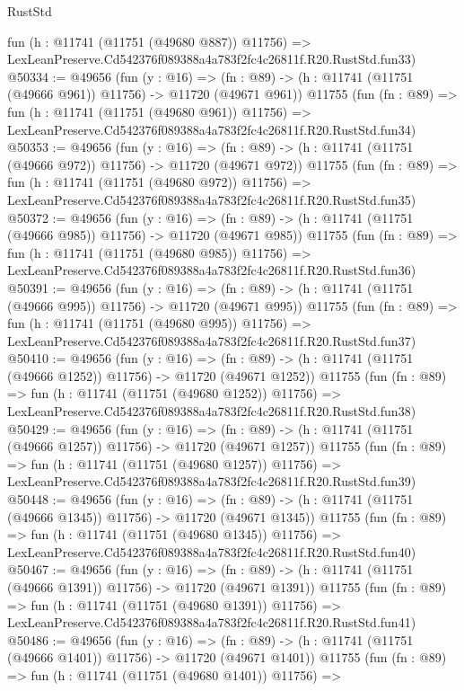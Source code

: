 \begin{lexlean}{RustStd}
\begin{coremodule}
    fun (h : @11741 (@11751 (@49680 @887)) @11756) =>
    LexLeanPreserve.Cd542376f089388a4a783f2fc4c26811f.R20.RustStd.fun33)
@50334 := @49656
    (fun (y : @16) =>
    (fn : @89) -> (h : @11741 (@11751 (@49666 @961)) @11756) -> @11720 (@49671 @961))
    @11755
    (fun (fn : @89) =>
    fun (h : @11741 (@11751 (@49680 @961)) @11756) =>
    LexLeanPreserve.Cd542376f089388a4a783f2fc4c26811f.R20.RustStd.fun34)
@50353 := @49656
    (fun (y : @16) =>
    (fn : @89) -> (h : @11741 (@11751 (@49666 @972)) @11756) -> @11720 (@49671 @972))
    @11755
    (fun (fn : @89) =>
    fun (h : @11741 (@11751 (@49680 @972)) @11756) =>
    LexLeanPreserve.Cd542376f089388a4a783f2fc4c26811f.R20.RustStd.fun35)
@50372 := @49656
    (fun (y : @16) =>
    (fn : @89) -> (h : @11741 (@11751 (@49666 @985)) @11756) -> @11720 (@49671 @985))
    @11755
    (fun (fn : @89) =>
    fun (h : @11741 (@11751 (@49680 @985)) @11756) =>
    LexLeanPreserve.Cd542376f089388a4a783f2fc4c26811f.R20.RustStd.fun36)
@50391 := @49656
    (fun (y : @16) =>
    (fn : @89) -> (h : @11741 (@11751 (@49666 @995)) @11756) -> @11720 (@49671 @995))
    @11755
    (fun (fn : @89) =>
    fun (h : @11741 (@11751 (@49680 @995)) @11756) =>
    LexLeanPreserve.Cd542376f089388a4a783f2fc4c26811f.R20.RustStd.fun37)
@50410 := @49656
    (fun (y : @16) =>
    (fn : @89) -> (h : @11741 (@11751 (@49666 @1252)) @11756) -> @11720 (@49671 @1252))
    @11755
    (fun (fn : @89) =>
    fun (h : @11741 (@11751 (@49680 @1252)) @11756) =>
    LexLeanPreserve.Cd542376f089388a4a783f2fc4c26811f.R20.RustStd.fun38)
@50429 := @49656
    (fun (y : @16) =>
    (fn : @89) -> (h : @11741 (@11751 (@49666 @1257)) @11756) -> @11720 (@49671 @1257))
    @11755
    (fun (fn : @89) =>
    fun (h : @11741 (@11751 (@49680 @1257)) @11756) =>
    LexLeanPreserve.Cd542376f089388a4a783f2fc4c26811f.R20.RustStd.fun39)
@50448 := @49656
    (fun (y : @16) =>
    (fn : @89) -> (h : @11741 (@11751 (@49666 @1345)) @11756) -> @11720 (@49671 @1345))
    @11755
    (fun (fn : @89) =>
    fun (h : @11741 (@11751 (@49680 @1345)) @11756) =>
    LexLeanPreserve.Cd542376f089388a4a783f2fc4c26811f.R20.RustStd.fun40)
@50467 := @49656
    (fun (y : @16) =>
    (fn : @89) -> (h : @11741 (@11751 (@49666 @1391)) @11756) -> @11720 (@49671 @1391))
    @11755
    (fun (fn : @89) =>
    fun (h : @11741 (@11751 (@49680 @1391)) @11756) =>
    LexLeanPreserve.Cd542376f089388a4a783f2fc4c26811f.R20.RustStd.fun41)
@50486 := @49656
    (fun (y : @16) =>
    (fn : @89) -> (h : @11741 (@11751 (@49666 @1401)) @11756) -> @11720 (@49671 @1401))
    @11755
    (fun (fn : @89) =>
    fun (h : @11741 (@11751 (@49680 @1401)) @11756) =>

\end{coremodule}
\end{lexlean}
